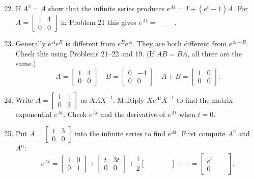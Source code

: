 \documentclass[14pt, a4paper]{article}
\begin{document}
\begin{enumerate}
    \setcounter{enumi}{21}
    \item If $A^2 = A$ show that the infinite series produces $e^{At} = I + (e^t - 1)A$. For $A = \begin{bmatrix} 1 & 4 \\ 0 & 0 \end{bmatrix}$ in Problem 21 this gives $e^{At} = \underline{\hspace{1cm}}$.

    \item Generally $e^A e^B$ is different from $e^B e^A$. They are both different from $e^{A+B}$. Check this using Problems 21--22 and 19. (If $AB = BA$, all three are the same.)
          \[
              A = \begin{bmatrix} 1 & 4 \\ 0 & 0 \end{bmatrix} \quad B = \begin{bmatrix} 0 & -4 \\ 0 & 0 \end{bmatrix} \quad A + B = \begin{bmatrix} 1 & 0 \\ 0 & 0 \end{bmatrix} .
          \]

    \item Write $A = \begin{bmatrix} 1 & 1 \\ 0 & 3 \end{bmatrix}$ as $X \Lambda X^{-1}$. Multiply $X e^{\Lambda t} X^{-1}$ to find the matrix exponential $e^{At}$. Check $e^{At}$ and the derivative of $e^{At}$ when $t = 0$.

    \item Put $A = \begin{bmatrix} 1 & 3 \\ 0 & 0 \end{bmatrix}$ into the infinite series to find $e^{At}$. First compute $A^2$ and $A^n$:
          \[
              e^{At} = \begin{bmatrix} 1 & 0 \\ 0 & 1 \end{bmatrix} + \begin{bmatrix} t & 3t \\ 0 & 0 \end{bmatrix} + \frac{1}{2} \begin{bmatrix} \quad & \quad \\ \quad & \quad \end{bmatrix} + \cdots = \begin{bmatrix} e^t & \quad \\ 0 & \quad \end{bmatrix} .
          \]


\end{enumerate}
\end{document}
